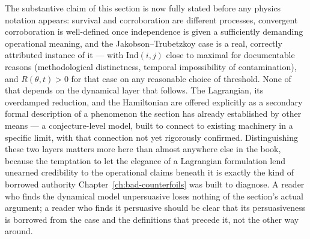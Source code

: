 The substantive claim of this section is now fully stated before any physics notation appears: survival and corroboration are different processes, convergent corroboration is well-defined once independence is given a sufficiently demanding operational meaning, and the Jakobson--Trubetzkoy case is a real, correctly attributed instance of it --- with $\mathrm{Ind}(i,j)$ close to maximal for documentable reasons (methodological distinctness, temporal impossibility of contamination), and $R(\theta,t) > 0$ for that case on any reasonable choice of threshold. None of that depends on the dynamical layer that follows. The Lagrangian, its overdamped reduction, and the Hamiltonian are offered explicitly as a secondary formal description of a phenomenon the section has already established by other means --- a conjecture-level model, built to connect to existing machinery in a specific limit, with that connection not yet rigorously confirmed. Distinguishing these two layers matters more here than almost anywhere else in the book, because the temptation to let the elegance of a Lagrangian formulation lend unearned credibility to the operational claims beneath it is exactly the kind of borrowed authority Chapter~\ref{ch:bad-counterfoils} was built to diagnose. A reader who finds the dynamical model unpersuasive loses nothing of the section's actual argument; a reader who finds it persuasive should be clear that its persuasiveness is borrowed from the case and the definitions that precede it, not the other way around.
